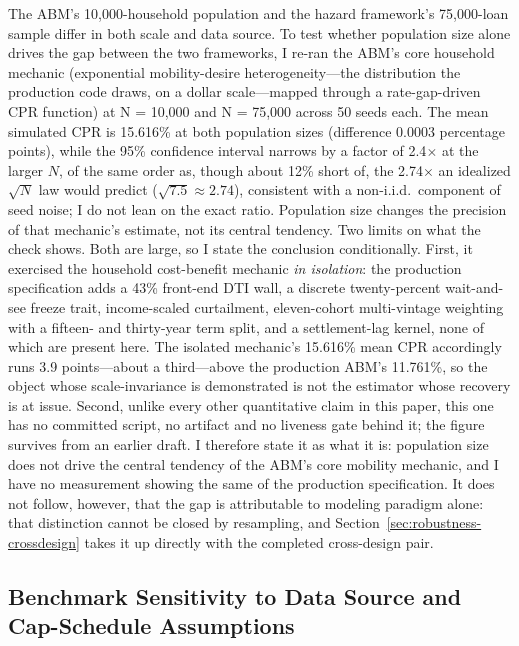 \documentclass[12pt]{article}
\begin{document}
The ABM's 10,000-household population and the hazard framework's 75,000-loan sample differ in both scale and data source. To test whether population size alone drives the gap between the two frameworks, I re-ran the ABM's core household mechanic (exponential mobility-desire heterogeneity---the distribution the production code draws, on a dollar scale---mapped through a rate-gap-driven CPR function) at N = 10,000 and N = 75,000 across 50 seeds each. The mean simulated CPR is 15.616\% at both population sizes (difference 0.0003 percentage points), while the 95\% confidence interval narrows by a factor of 2.4$\times$ at the larger $N$, of the same order as, though about 12\% short of, the 2.74$\times$ an idealized $\sqrt{N}$ law would predict ($\sqrt{7.5} \approx 2.74$), consistent with a non-i.i.d.\ component of seed noise; I do not lean on the exact ratio. Population size changes the precision of that mechanic's estimate, not its central tendency. Two limits on what the check shows. Both are large, so I state the conclusion conditionally. First, it exercised the household cost-benefit mechanic \emph{in isolation}: the production specification adds a 43\% front-end DTI wall, a discrete twenty-percent wait-and-see freeze trait, income-scaled curtailment, eleven-cohort multi-vintage weighting with a fifteen- and thirty-year term split, and a settlement-lag kernel, none of which are present here. The isolated mechanic's 15.616\% mean CPR accordingly runs 3.9 points---about a third---above the production ABM's 11.761\%, so the object whose scale-invariance is demonstrated is not the estimator whose recovery is at issue. Second, unlike every other quantitative claim in this paper, this one has no committed script, no artifact and no liveness gate behind it; the figure survives from an earlier draft. I therefore state it as what it is: population size does not drive the central tendency of the ABM's core mobility mechanic, and I have no measurement showing the same of the production specification. It does not follow, however, that the gap is attributable to modeling paradigm alone: that distinction cannot be closed by resampling, and Section~\ref{sec:robustness-crossdesign} takes it up directly with the completed cross-design pair.

\subsection{Benchmark Sensitivity to Data Source and Cap-Schedule Assumptions}\label{sec:robustness-benchmark}
\end{document}
